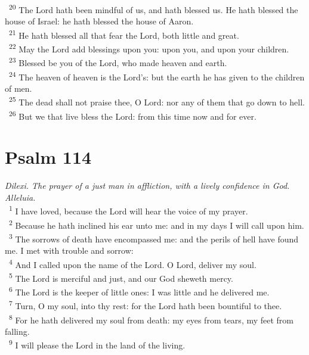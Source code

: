\documentclass[a5paper,12pt]{article}
\begin{document}
\begin{multicols*}{2}
~\textsuperscript{20} The Lord hath been mindful of us, and hath blessed us. He hath blessed the house of Israel: he hath blessed the house of Aaron.\\
~\textsuperscript{21} He hath blessed all that fear the Lord, both little and great.\\
~\textsuperscript{22} May the Lord add blessings upon you: upon you, and upon your children.\\
~\textsuperscript{23} Blessed be you of the Lord, who made heaven and earth.\\
~\textsuperscript{24} The heaven of heaven is the Lord's: but the earth he has given to the children of men.\\
~\textsuperscript{25} The dead shall not praise thee, O Lord: nor any of them that go down to hell.\\
~\textsuperscript{26} But we that live bless the Lord: from this time now and for ever.\\

\section{Psalm 114}
\label{sec:org50edb36}
\emph{Dilexi. The prayer of a just man in affliction, with a lively confidence in God. Alleluia.}\\

~\textsuperscript{1} I have loved, because the Lord will hear the voice of my prayer.\\
~\textsuperscript{2} Because he hath inclined his ear unto me: and in my days I will call upon him.\\
~\textsuperscript{3} The sorrows of death have encompassed me: and the perils of hell have found me. I met with trouble and sorrow:\\
~\textsuperscript{4} And I called upon the name of the Lord. O Lord, deliver my soul.\\
~\textsuperscript{5} The Lord is merciful and just, and our God sheweth mercy.\\
~\textsuperscript{6} The Lord is the keeper of little ones: I was little and he delivered me.\\
~\textsuperscript{7} Turn, O my soul, into thy rest: for the Lord hath been bountiful to thee.\\
~\textsuperscript{8} For he hath delivered my soul from death: my eyes from tears, my feet from falling.\\
~\textsuperscript{9} I will please the Lord in the land of the living.\\


\end{multicols*}
\end{document}
